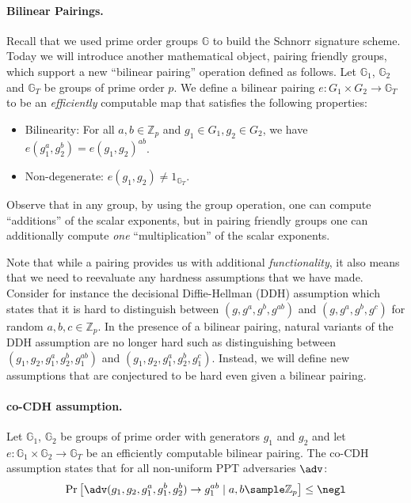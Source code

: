 \documentclass[12pt]{tufte-book}
\begin{document}
\paragraph{Bilinear Pairings.} Recall that we used prime order groups $\mathbb{G}$ to build the Schnorr signature scheme. Today we will introduce another mathematical object, pairing friendly groups, which support a new ``bilinear pairing'' operation defined as follows. Let $\mathbb{G}_1$, $\mathbb{G}_2$ and $\mathbb{G}_T$ be groups of prime order $p$. We define a bilinear pairing $e: G_1 \times G_2 \rightarrow \mathbb{G}_T$ to be an \emph{efficiently} computable map that satisfies the following properties:
\begin{itemize}
    \item Bilinearity: For all $a, b \in \mathbb{Z}_p$ and $g_1 \in G_1, g_2 \in G_2$, we have $e(g_1^a, g_2^b) = e(g_1, g_2)^{ab}$.
    \item Non-degenerate: $e(g_1, g_2) \neq 1_{\mathbb{G}_T}$.
\end{itemize}
Observe that in any group, by using the group operation, one can compute ``additions'' of the scalar exponents, but in pairing friendly groups one can additionally compute \emph{one} ``multiplication'' of the scalar exponents.

Note that while a pairing provides us with additional \emph{functionality}, it also means that we need to reevaluate any hardness assumptions that we have made. Consider for instance the decisional Diffie-Hellman (DDH) assumption which states that it is hard to distinguish between $(g, g^a, g^b, g^{ab})$ and $(g, g^a, g^b, g^c)$ for random $a, b, c \in \mathbb{Z}_p$. In the presence of a bilinear pairing, natural variants of the DDH assumption are no longer hard such as distinguishing between $(g_1, g_2, g_1^a, g_2^b, g_1^{ab})$ and $(g_1, g_2, g_1^a, g_2^b, g_1^{c})$. Instead, we will define new assumptions that are conjectured to be hard even given a bilinear pairing.

\paragraph{co-CDH assumption.} Let $\mathbb{G}_1$, $\mathbb{G}_2$ be groups of prime order with generators $g_1$ and $g_2$ and let $e: \mathbb{G}_1 \times \mathbb{G}_2 \rightarrow \mathbb{G}_T$ be an efficiently computable bilinear pairing. The co-CDH assumption states that for all non-uniform PPT adversaries $\adv$:
\begin{align*}
    \Pr\left[ \adv(g_1, g_2, g_1^a, g_1^b, g_2^b) \to g_1^{ab} \mid a,b \sample \mathbb{Z}_p \right] \leq \negl
\end{align*}
\end{document}

